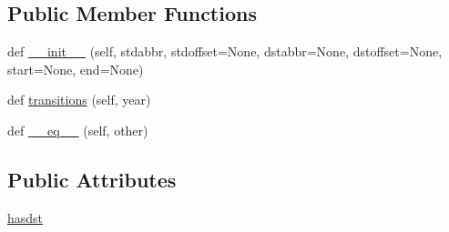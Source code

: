 \subsection*{Public Member Functions}
\begin{DoxyCompactItemize}
\item 
def \hyperlink{classdateutil_1_1tz_1_1tz_1_1tzrange_a52f4af837a27b0ef43c6f25177a92c2d}{\+\_\+\+\_\+init\+\_\+\+\_\+} (self, stdabbr, stdoffset=None, dstabbr=None, dstoffset=None, start=None, end=None)
\item 
def \hyperlink{classdateutil_1_1tz_1_1tz_1_1tzrange_a1d065e90e5f92050296b7d419dadb3e0}{transitions} (self, year)
\item 
def \hyperlink{classdateutil_1_1tz_1_1tz_1_1tzrange_af334a07f2b7e87f5fda0834843adce3a}{\+\_\+\+\_\+eq\+\_\+\+\_\+} (self, other)
\end{DoxyCompactItemize}
\subsection*{Public Attributes}
\begin{DoxyCompactItemize}
\item 
\hyperlink{classdateutil_1_1tz_1_1tz_1_1tzrange_ad0c561e159c0b15b22303ebb6f751ec3}{hasdst}
\end{DoxyCompactItemize}


